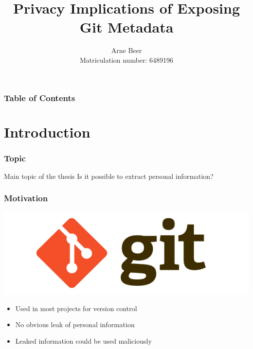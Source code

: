 \documentclass[t]{beamer}
\title[Privacy Implications of Exposing Git Metadata]
{Privacy Implications of Exposing Git Metadata}
\author[Beer]{Arne Beer \\ \footnotesize Matriculation number: 6489196}
\begin{document}
\begin{frame}[plain]
    \maketitle
\end{frame}

\begin{frame}
    \frametitle{Table of Contents}
	\tableofcontents
\end{frame}

\section{Introduction}
\begin{frame}
    \frametitle{Topic}
    \begin{center}
        \vspace{1cm}
        \begin{block}{Main topic of the thesis}
            Is it possible to extract personal information?
        \end{block}
    \end{center}
\end{frame}

\begin{frame}
    \frametitle{Motivation}
    \vspace{5mm}
    \begin{center}
        \includegraphics[scale=0.15]{./pic/git-logo.png}
    \end{center}
    \begin{itemize}
        \item Used in most projects for version control
        \pause{}
        \item No obvious leak of personal information
        \pause{}
        \item Leaked information could be used maliciously
    \end{itemize}
\end{frame}
\end{document}

